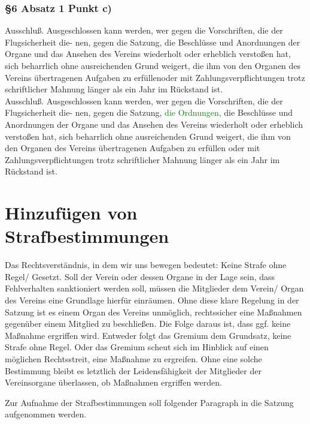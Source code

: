 \documentclass[10pt,a4paper,parskip=half]{scrartcl}
\newcommand{\new}[1]{\textcolor{Green}{#1}}
\newcommand{\change}[1]{
  \begin{adjustwidth}{20pt}{20pt}
    #1
  \end{adjustwidth}
}
\newcommand{\compare}[3]{\change{\subsubsection*{#1}\begin{multicols}{2}#2\columnbreak\\#3\end{multicols}}}
\begin{document}
  \compare{§6 Absatz 1 Punkt c)}
  {Ausschluß. Ausgeschlossen kann werden, wer gegen die Vorschriften, die der Flugsicherheit die-
nen, gegen die Satzung, die Beschlüsse und Anordnungen der Organe und das Ansehen des Vereins wiederholt oder erheblich verstoßen hat, sich beharrlich ohne ausreichenden Grund weigert, die ihm von den Organen des Vereins übertragenen Aufgaben zu erfüllenoder mit
Zahlungsverpflichtungen trotz schriftlicher Mahnung länger als ein Jahr im Rückstand ist.}
{Ausschluß. Ausgeschlossen kann werden, wer gegen die Vorschriften, die der Flugsicherheit die-
nen, gegen die Satzung, \new{die Ordnungen,} die Beschlüsse und Anordnungen der Organe und das
Ansehen des Vereins wiederholt oder erheblich verstoßen hat, sich beharrlich ohne ausreichenden
Grund weigert, die ihm von den Organen des Vereins übertragenen Aufgaben zu erfüllen oder mit
Zahlungsverpflichtungen trotz schriftlicher Mahnung länger als ein Jahr im Rückstand ist.}

\clearpage
  \section{Hinzufügen von Strafbestimmungen}
  Das Rechtsverständnis, in dem wir uns bewegen bedeutet: Keine Strafe ohne Regel/ Gesetzt. Soll der Verein oder dessen Organe in der Lage sein, dass Fehlverhalten sanktioniert werden soll, müssen die Mitglieder dem Verein/ Organ des Vereins eine Grundlage hierfür einräumen. Ohne diese klare Regelung in der Satzung ist es einem Organ des Vereins unmöglich, rechtssicher eine Maßnahmen gegenüber einem Mitglied zu beschließen. Die Folge daraus ist, dass ggf. keine Maßnahme ergriffen wird. Entweder folgt das Gremium dem Grundsatz, keine Strafe ohne Regel. Oder das Gremium scheut sich im Hinblick auf einen möglichen Rechtsstreit, eine Maßnahme zu ergreifen. Ohne eine solche Bestimmung bleibt es letztlich der Leidensfähigkeit der Mitglieder der Vereinsorgane überlassen, ob Maßnahmen ergriffen werden. 

  Zur Aufnahme der Strafbestimmungen soll folgender Paragraph in die Satzung aufgenommen werden.
\end{document}
